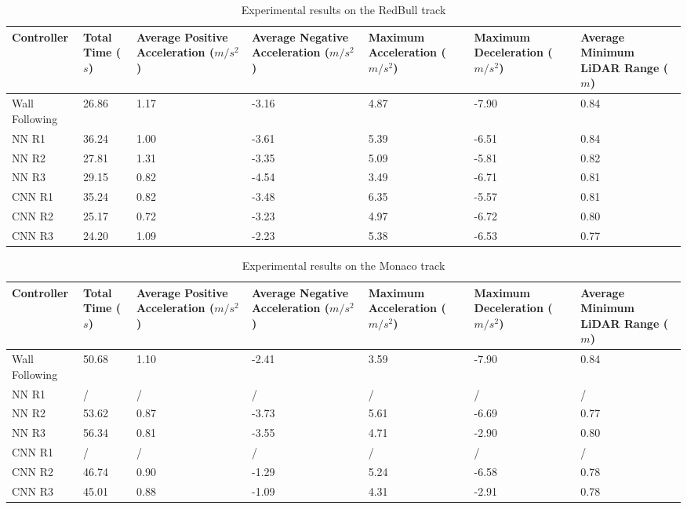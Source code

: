 \begin{table}
\centering
\begin{tabularx}{\textwidth}{||X|X|X|X|X|X|X||} 
\hline
 Controller & Total Time ($s$) & Average Positive Acceleration ($m/s^2$)& Average Negative Acceleration ($m/s^2$) & Maximum Acceleration ($m/s^2$) & Maximum Deceleration ($m/s^2$) & Average Minimum LiDAR Range ($m$)\\ [0.5ex] 
 \hline\hline
Wall Following & 26.86 & 1.17 & -3.16 & 4.87 & -7.90 & 0.84\\[0.5ex] 
 \hline
 NN R1 & 36.24 & 1.00 & -3.61 & 5.39 & -6.51 & 0.84\\[0.5ex] 
 \hline
 NN R2 & 27.81 & 1.31 & -3.35 & 5.09 & -5.81 & 0.82\\[0.5ex] 
 \hline
NN R3 & 29.15 & 0.82 & -4.54 & 3.49 & -6.71 & 0.81\\[0.5ex] 
 \hline
 CNN R1 & 35.24 & 0.82 & -3.48 & 6.35 & -5.57 & 0.81\\[0.5ex] 
 \hline
 CNN R2 & 25.17 & 0.72 & -3.23 & 4.97 & -6.72 & 0.80\\[0.5ex] 
 \hline
 CNN R3 & 24.20 & 1.09 & -2.23 & 5.38 & -6.53 & 0.77\\[0.5ex] 
 \hline
\end{tabularx}
\caption{Experimental results on the RedBull track}
\label{redbull_results}
\end{table}

\begin{table}
\centering
\begin{tabularx}{\textwidth}{||X|X|X|X|X|X|X||} 
\hline
 Controller & Total Time ($s$) & Average Positive Acceleration ($m/s^2$)& Average Negative Acceleration ($m/s^2$) & Maximum Acceleration ($m/s^2$) & Maximum Deceleration ($m/s^2$) & Average Minimum LiDAR Range ($m$)\\ [0.5ex] 
 \hline\hline
Wall Following & 50.68 & 1.10 & -2.41 & 3.59 & -7.90 & 0.84\\[0.5ex] 
 \hline
 NN R1 & / & / & / & / & / & /\\[0.5ex] 
 \hline
 NN R2 & 53.62 & 0.87 & -3.73 & 5.61 & -6.69 & 0.77\\[0.5ex] 
 \hline
NN R3 & 56.34 & 0.81 & -3.55 & 4.71 & -2.90 & 0.80\\[0.5ex] 
 \hline
 CNN R1 & / & / & / & / & / & /\\[0.5ex] 
 \hline
 CNN R2 & 46.74 & 0.90 & -1.29 & 5.24 & -6.58 & 0.78\\[0.5ex] 
 \hline
 CNN R3 & 45.01 & 0.88 & -1.09 & 4.31 & -2.91 & 0.78\\[0.5ex] 
 \hline
\end{tabularx}
\caption{Experimental results on the Monaco track}
\label{monaco_results}
\end{table}


